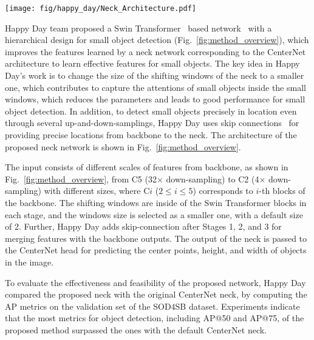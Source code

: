 \documentclass{mva_style}
\begin{document}
\begin{figure*}[t]
  \begin{center}
    \texttt{[image: fig/happy\_day/Neck\_Architecture.pdf]}
  \end{center}
  \vspace{-1.5em}
  \caption{Happy Day team proposed neck network~\cite{happy_day_mva2023}, the windows size 2 was used in each Swin Transformer Block, and Up Merging~\cite{shi2016real} Module upsamples features and merges with those extracted in the backbone to effectively
recognize object features in SOD.}
\vspace{-0.8em}
  \label{fig:method_overview}
\end{figure*}

Happy Day team proposed a Swin Transformer~\cite{liu2021swin} based network~\cite{happy_day_mva2023} with a hierarchical design for small object detection (Fig.~\ref{fig:method_overview}), which improves the features learned by a neck network corresponding to the CenterNet~\cite{zhou2019objects} architecture to learn effective features for small objects. The key idea in Happy Day's work is to change the size of the shifting windows of the neck to a smaller one, which contributes to capture the attentions of small objects inside the small windows, which reduces the parameters and leads to good performance for small object detection. In addition, to detect small objects precisely in location even through several up-and-down-samplings, Happy Day uses skip connections~\cite{ronneberger2015u} for providing precise locations from backbone to the neck. 
The architecture of the proposed neck network is shown in Fig.~\ref{fig:method_overview}.

The input consists of different scales of features from backbone, as shown in Fig.~\ref{fig:method_overview}, from C5 (32{$\times$} down-sampling) to C2 (4{$\times$} down-sampling) with different sizes, where C$i$ ($2 \leq i \leq 5$) corresponds to $i$-th blocks of the backbone. The shifting windows are inside of the Swin Transformer blocks in each stage, and the windows size is selected as a smaller one, with a default size of 2. Further, Happy Day adds skip-connection after Stages 1, 2, and 3 for merging features with the backbone outputs. The output of the neck is passed to the CenterNet head for predicting the center points, height, and width of objects in the image.

To evaluate the effectiveness and feasibility of the proposed network, Happy Day compared the proposed neck with the original CenterNet neck, by computing the AP metrics on the validation set of the SOD4SB dataset. Experiments indicate that the most metrics for object detection, including AP@50 and AP@75, of the proposed method surpassed the ones with the default CenterNet neck.
\end{document}
